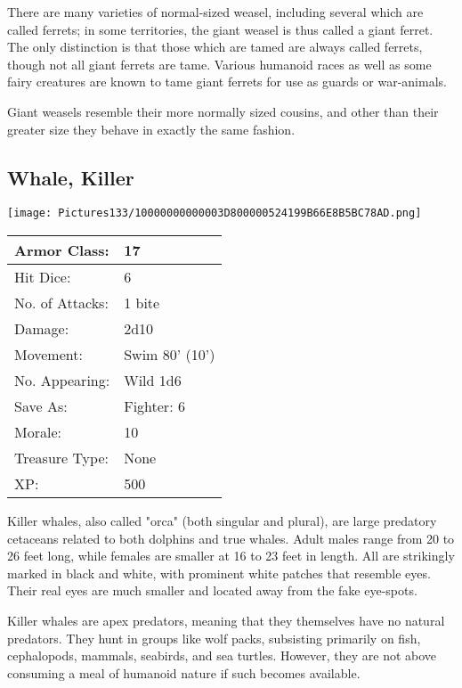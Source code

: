 \documentclass[a4paper,twoside,openany,10pt]{book}
\begin{document}
\begin{multicols}{2}
There are many varieties of normal-sized weasel, including several which are called ferrets; in some territories, the giant weasel is thus called a giant ferret. The only distinction is that those which are tamed are always called ferrets, though not all giant ferrets are tame. Various humanoid races as well as some fairy creatures are known to tame giant ferrets for use as guards or war-animals.

Giant weasels resemble their more normally sized cousins, and other than their greater size they behave in exactly the same fashion.

\subsection*{Whale, Killer}\label{whale-killer}



\begin{center} \texttt{[image: Pictures133/10000000000003D800000524199B66E8B5BC78AD.png]} \end{center}


\begin{tabularx}{0.50\textwidth}{@{}lX@{}}
Armor Class: & 17 \\\hline
Hit Dice: & 6 \\\hline
No. of Attacks: & 1 bite \\\hline
Damage: & 2d10 \\\hline
Movement: & Swim 80' (10') \\\hline
No. Appearing: & Wild 1d6 \\\hline
Save As: & Fighter: 6 \\\hline
Morale: & 10 \\\hline
Treasure Type: & None \\\hline
XP: & 500 \\\hline
\end{tabularx}


Killer whales, also called "orca" (both singular and plural), are large predatory cetaceans related to both dolphins and true whales. Adult males range from 20 to 26 feet long, while females are smaller at 16 to 23 feet in length. All are strikingly marked in black and white, with prominent white patches that resemble eyes. Their real eyes are much smaller and located away from the fake eye-spots.

Killer whales are apex predators, meaning that they themselves have no natural predators. They hunt in groups like wolf packs, subsisting primarily on fish, cephalopods, mammals, seabirds, and sea turtles. However, they are not above consuming a meal of humanoid nature if such becomes available. 



\end{multicols}
\end{document}
